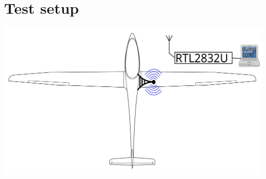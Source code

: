 \documentclass[a4paper]{article}
\begin{document}
\section{Test setup}
\includegraphics[width=\textwidth]{setup}



\end{document}
